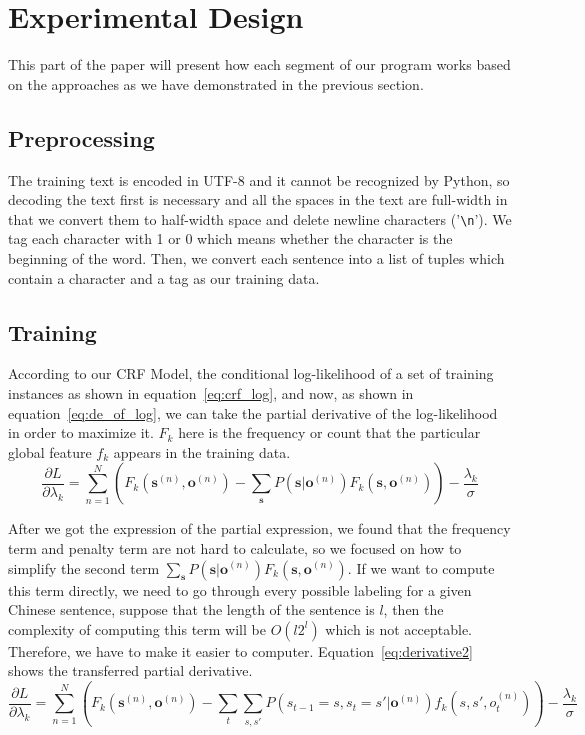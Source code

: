 \documentclass[UTF8,11pt]{article}
\begin{document}
\section{Experimental Design}
\noindent This part of the paper will present how each segment of our program works based on the approaches as we have demonstrated in the previous section. 
\subsection{Preprocessing}
\noindent The training text is encoded in UTF-8 and it cannot be recognized by Python, so decoding the text first is necessary and all the spaces in the text are full-width in that we convert them to half-width space and delete newline characters ('\verb!\n!'). We tag each character with 1 or 0 which means whether the character is the beginning of the word. Then, we convert each sentence into a list of tuples which contain a character and a tag as our training data.

\subsection{Training}
\noindent According to our CRF Model, the conditional log-likelihood of a set of training instances as shown in equation~\ref{eq:crf_log}, and now, as shown in equation~\ref{eq:de_of_log}, we can take the partial derivative of the log-likelihood in order to maximize it. $F_k$ here is the frequency or count that the particular global feature $f_k$ appears in the training data.
\begin{equation} \label{eq:de_of_log}
    \frac{\partial L}{\partial \lambda_k} = \sum_{n=1}^{N} \left( F_k ( \mathbf{s}^{(n)}, \mathbf{o}^{(n)} ) - \sum_{\mathbf{s}} P( \mathbf{s} | \mathbf{o}^{(n)}) F_k ( \mathbf{s}, \mathbf{o}^{(n)} ) \right) - \frac{\lambda_k}{\sigma}
\end{equation}

After we got the expression of the partial expression, we found that the frequency term and penalty term are not hard to calculate, so we focused on how to simplify the second term $\sum_{\mathbf{s}} P( \mathbf{s} | \mathbf{o}^{(n)}) F_k ( \mathbf{s}, \mathbf{o}^{(n)} )$. If we want to compute this term directly, we need to go through every possible labeling for a given Chinese sentence, suppose that the length of the sentence is $l$, then the complexity of computing this term will be $O(l2^l)$ which is not acceptable. Therefore, we have to make it easier to computer. Equation~\ref{eq:derivative2} shows the transferred partial derivative.
\begin{equation} \label{eq:derivative2}
      \frac{\partial L}{\partial \lambda_k} = \sum_{n=1}^{N} \left( F_k ( \mathbf{s}^{(n)}, \mathbf{o}^{(n)} ) - \sum_t \sum_{s, s'}P(s_{t-1} = s, s_t = s' | \mathbf{o}^{(n)}) f_k(s, s', o^{(n)}_t) \right) - \frac{\lambda_k}{\sigma}
\end{equation}
\end{document}
